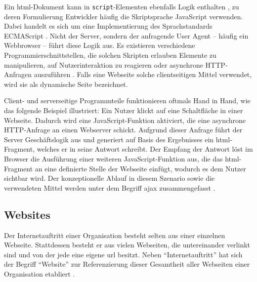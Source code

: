             Ein \gls{html}-Dokument kann in \texttt{script}-Elementen ebenfalls Logik enthalten
            \cite[Kapitel 4.11]{w3c:html5},
            zu deren Formulierung Entwickler häufig die Skriptsprache JavaScript verwenden.
            Dabei handelt es sich um eine Implementierung des Sprachstandards ECMAScript
            \cite{ecma:ecmaScript}.
            Nicht der Server, sondern der anfragende User Agent -- häufig ein Webbrowser -- führt diese Logik aus.
            Es existieren verschiedene Programmierschnittstellen,
            die solchen Skripten erlauben
            Elemente zu manipulieren, auf Nutzerinteraktion zu reagieren
            oder asynchrone HTTP-Anfragen auszuführen \cite[Kapitel 8]{whatwg:html}\cite{whatwg:xhr}.
            Falls eine Webseite solche clientseitigen Mittel verwendet,
            wird sie als dynamische Seite bezeichnet.
            
            Client- und serverseitige Programmteile funktionieren oftmals Hand in Hand,
            wie das folgende Beispiel illustriert:
            Ein Nutzer klickt auf eine Schaltfläche in einer Webseite.
            Dadurch wird eine JavaScript-Funktion aktiviert,
            die eine asynchrone HTTP-Anfrage an einen Webserver schickt.
            Aufgrund dieser Anfrage führt der Server Geschäftslogik aus
            und generiert auf Basis des Ergebnisses ein \gls{html}-Fragment,
            welches er in seine Antwort schreibt.
            Der Empfang der Antwort löst im Browser die Ausführung einer weiteren
            JavaScript-Funktion aus, die das \gls{html}-Fragment
            an eine definierte Stelle der Webseite einfügt,
            wodurch es dem Nutzer sichtbar wird.
            Der konzeptionelle Ablauf in diesem Szenario sowie die verwendeten Mittel
            werden unter dem Begriff \gls{ajax} zusammengefasst \cite{garrett:ajax}.

        \subsection{Websites}
            \label{section:problemAnalysisWebpagesInTheWWWWebsites}
            Der Internetauftritt einer Organisation besteht selten aus einer
            einzelnen Webseite.
            Stattdessen besteht er aus vielen Webseiten,
            die untereinander verlinkt sind und von der jede eine eigene
            \gls{url} besitzt.
            Neben "`Internetauftritt"' hat sich der Begriff "`Website"' zur
            Referenzierung dieser Gesamtheit aller Webseiten einer Organisation
            etabliert \cite{duden:Internetauftritt, oxford:Website}.